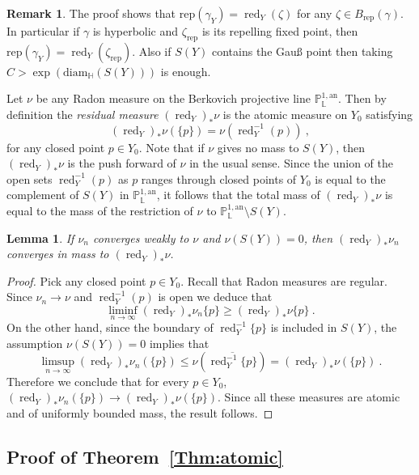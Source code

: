 \documentclass[11pt]{article}
\newtheorem{lemm}[theo]{Lemma}
\theoremstyle{definition}
\newtheorem{rema}[theo]{Remark}
\numberwithin{equation}{section}
\numberwithin{figure}{section}
\numberwithin{table}{section}
\DeclareMathOperator{\red}{red}
\newcommand{\an}{\mathrm{an}}
\newcommand{\PP}{\mathbb{P}}
\newcommand{\Laurent}{\mathbb{L}}
\newcommand{\rep}{\mathrm{rep}}
\begin{document}
\begin{rema}\label{rem:more precise}
The proof shows that $\mathrm{rep}(\gamma_Y) = \red_Y (\zeta)$ for any $\zeta \in B_{\rep}(\gamma)$. In particular if $\gamma$ is hyperbolic and $\zeta_{\mathrm{rep}}$ is its repelling fixed point, then $\mathrm{rep}(\gamma_Y) = \red_Y (\zeta_{\mathrm{rep}})$. Also if $S(Y)$ contains the Gau{\ss} point then taking $C > \exp (\mathrm{diam}_\mathbb{H} (S(Y)))$ is enough.
\end{rema}

Let $\nu$ be any Radon measure on the Berkovich projective line $\PP^{1,\an}_{\Laurent}$. Then by definition the \emph{residual measure} $(\red_Y)_* \nu$ is the atomic measure on $Y_0$ satisfying
\[
{(\red_Y)_* \nu} (\{ p \}) = \nu (\red_Y^{-1}(p))~,
\]
for any closed point $p\in Y_0$. Note that if $\nu$ gives no mass to $S(Y)$, then $(\red_Y)_* \nu$ is the push forward of $\nu$ in the usual sense. Since the union of the open sets $\red_Y^{-1}(p)$ as $p$ ranges through closed points of $Y_0$ is equal to the complement of $S(Y)$ in $\PP^{1,\an}_{\Laurent}$, it follows that the total mass of $(\red_Y)_* \nu$ is equal to the mass of the restriction of $\nu$ to $\PP^{1,\an}_{\Laurent}\setminus S(Y)$.

\begin{lemm}\label{lem:cvg mass}
If $\nu_n$ converges weakly to $\nu$ and $\nu(S(Y)) =0$, then $(\red_Y)_* \nu_n$ converges in mass to $(\red_Y)_* \nu$.
\end{lemm}

\begin{proof}
Pick any closed point $p\in Y_0$. Recall that Radon measures are regular. Since $\nu_n \to \nu$ and $\red_Y^{-1}(p)$ is open we deduce that
\[
\liminf_{n\to\infty} (\red_Y)_* \nu_n \{ p \} \ge (\red_Y)_* \nu \{ p \}~.
\]
On the other hand, since the boundary of $\red_Y^{-1} \{ p \}$ is included in $S(Y)$, the assumption $\nu(S(Y)) =0$ implies that
\[
\limsup_{n\to\infty} (\red_Y)_* \nu_n (\{ p \}) \le \nu \left(\overline{ \red_Y^{-1} \{ p \}} \right) = (\red_Y)_* \nu (\{ p \})~.
\]
Therefore we conclude that for every $p\in Y_0$, $(\red_Y)_* \nu_n(\{p \}) \to (\red_Y)_* \nu (\{p\})$. Since all these measures are atomic and of uniformly bounded mass, the result follows.
\end{proof}

\subsection{Proof of Theorem~\ref{Thm:atomic}}\label{subs:atomic}
\end{document}
